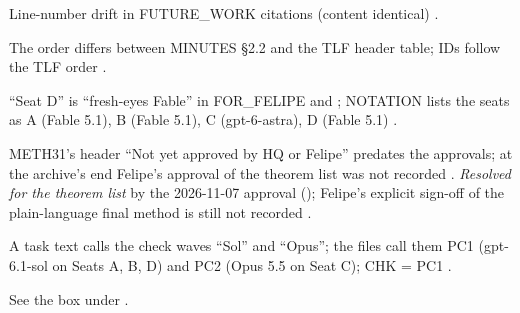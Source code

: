 \begin{uncertain}
Line-number drift in FUTURE\_WORK citations (content identical) .
\end{uncertain}
\begin{uncertain}
The order differs between MINUTES §2.2 and the TLF header table; IDs follow the TLF order .
\end{uncertain}
\begin{uncertain}
``Seat D'' is ``fresh-eyes Fable'' in FOR\_FELIPE and ; NOTATION lists the seats as A (Fable 5.1), B (Fable 5.1), C (gpt-6-astra), D (Fable 5.1) .
\end{uncertain}
\begin{uncertain}[U12 · approvals]
METH31's header ``Not yet approved by HQ or Felipe'' predates the approvals; at the archive's end Felipe's approval of the theorem list was not recorded . \emph{Resolved for the theorem list} by the 2026-11-07 approval (); Felipe's explicit sign-off of the plain-language final method is still not recorded .
\end{uncertain}
\begin{uncertain}
A task text calls the check waves ``Sol'' and ``Opus''; the files call them PC1 (gpt-6.1-sol on Seats A, B, D) and PC2 (Opus 5.5 on Seat C); CHK = PC1 .
\end{uncertain}
\begin{uncertain}
See the box under  .
\end{uncertain}

